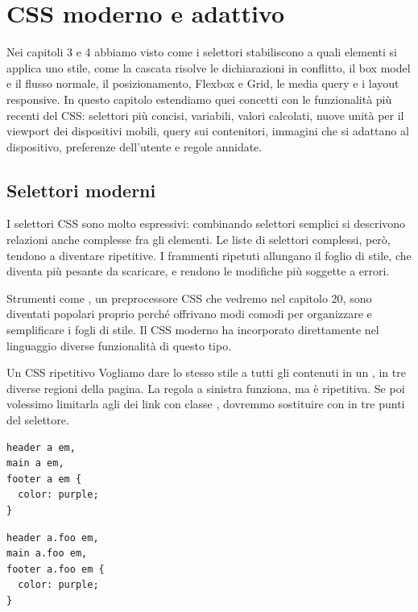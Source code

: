 \chapter{CSS moderno e adattivo}

Nei capitoli 3 e 4 abbiamo visto come i selettori stabiliscono a quali elementi
si applica uno stile, come la cascata risolve le dichiarazioni in conflitto, il
box model e il flusso normale, il posizionamento, Flexbox e Grid, le media query
e i layout responsive. In questo capitolo estendiamo quei concetti con le
funzionalità più recenti del CSS: selettori più concisi, variabili, valori
calcolati, nuove unità per il viewport dei dispositivi mobili, query sui
contenitori, immagini che si adattano al dispositivo, preferenze dell'utente e
regole annidate.

\section{Selettori moderni}

I selettori CSS sono molto espressivi: combinando selettori semplici si
descrivono relazioni anche complesse fra gli elementi. Le liste di selettori
complessi, però, tendono a diventare ripetitive. I frammenti ripetuti allungano
il foglio di stile, che diventa più pesante da scaricare, e rendono le modifiche
più soggette a errori.

Strumenti come , un preprocessore CSS che vedremo nel capitolo 20,
sono diventati popolari proprio perché offrivano modi comodi per organizzare e
semplificare i fogli di stile. Il CSS moderno ha incorporato direttamente nel
linguaggio diverse funzionalità di questo tipo.

\begin{esempio}{Un CSS ripetitivo}
Vogliamo dare lo stesso stile a tutti gli  contenuti in un , in tre
diverse regioni della pagina. La regola a sinistra funziona, ma è ripetitiva. Se
poi volessimo limitarla agli  dei link con classe , dovremmo
sostituire  con  in tre punti del selettore.

\begin{affianco}[0.5][c]
\begin{lstlisting}[style=css, name=link.css]
header a em,
main a em,
footer a em {
  color: purple;
}
\end{lstlisting}
\risultato
\begin{lstlisting}[style=css, name=link-foo.css]
header a.foo em,
main a.foo em,
footer a.foo em {
  color: purple;
}
\end{lstlisting}
\end{affianco}
\end{esempio}

